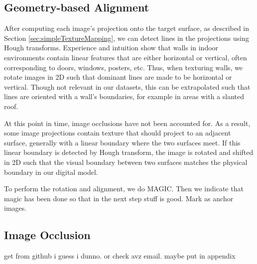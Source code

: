 \documentclass[]{spie}  %
\begin{document}
\subsection{Geometry-based Alignment}
\label{sec:projectionAndRotation}
After computing each image's projection onto the target surface, as
described in Section \ref{sec:simpleTextureMapping}, we can detect
lines in the projections using Hough transforms. Experience and
intuition show that walls in indoor environments contain linear
features that are either horizontal or vertical, often corresponding
to doors, windows, posters, etc. Thus, when texturing walls, we rotate
images in 2D such that dominant lines are made to be horizontal or
vertical. Though not relevant in our datasets, this can be extrapolated
such that lines are oriented with a wall's boundaries, for example in
areas with a slanted roof.

At this point in time, image occlusions have not been accounted
for. As a result, some image projections contain texture that should
project to an adjacent surface, generally with a linear boundary where
the two surfaces meet. If this linear boundary is detected by Hough
transform, the image is rotated and shifted in 2D such that
the visual boundary between two surfaces matches the physical boundary
in our digital model.

To perform the rotation and alignment, we do MAGIC.  Then we indicate
that magic has been done so that in the next step stuff is good. Mark
as anchor images.

\subsection{Image Occlusion}
get from github i guess i dunno. or check avz email. maybe put in appendix
\end{document}

